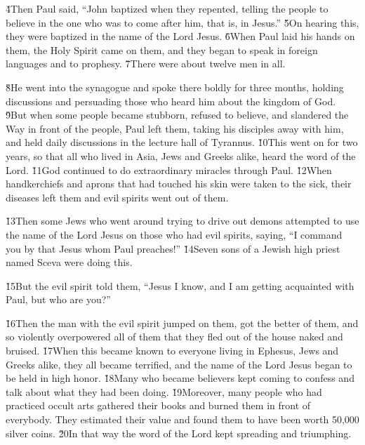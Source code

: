\v{4}Then Paul said, ``John baptized when they repented, telling the people to believe in the one who was to come after him, that is, in Jesus.'' \v{5}On hearing this, they were baptized in the name of the Lord Jesus. \v{6}When Paul laid his hands on them, the Holy Spirit came on them, and they began to speak in foreign languages and to prophesy. \v{7}There were about twelve men in all.

\v{8}He went into the synagogue and spoke there boldly for three months, holding discussions and persuading those who heard him about the kingdom of God. \v{9}But when some people became stubborn, refused to believe, and slandered the Way in front of the people, Paul left them, taking his disciples away with him, and held daily discussions in the lecture hall of Tyrannus. \v{10}This went on for two years, so that all who lived in Asia, Jews and Greeks alike, heard the word of the Lord. \v{11}God continued to do extraordinary miracles through Paul. \v{12}When handkerchiefs and aprons that had touched his skin were taken to the sick, their diseases left them and evil spirits went out of them.

\v{13}Then some Jews who went around trying to drive out demons attempted to use the name of the Lord Jesus on those who had evil spirits, saying, ``I command you by that Jesus whom Paul preaches!'' \v{14}Seven sons of a Jewish high priest named Sceva were doing this.

\v{15}But the evil spirit told them, ``Jesus I know, and I am getting acquainted with Paul, but who are you?''

\v{16}Then the man with the evil spirit jumped on them, got the better of them, and so violently overpowered all of them that they fled out of the house naked and bruised. \v{17}When this became known to everyone living in Ephesus, Jews and Greeks alike, they all became terrified, and the name of the Lord Jesus began to be held in high honor. \v{18}Many who became believers kept coming to confess and talk about what they had been doing. \v{19}Moreover, many people who had practiced occult arts gathered their books and burned them in front of everybody. They estimated their value and found them to have been worth 50,000 silver coins. \v{20}In that way the word of the Lord kept spreading and triumphing.

